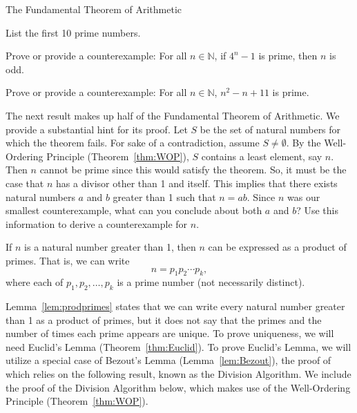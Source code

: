 \begin{section}{The Fundamental Theorem of Arithmetic}
\begin{problem}
List the first 10 prime numbers.
\end{problem}

\begin{problem}
Prove or provide a counterexample:  For all $n\in\mathbb{N}$, if $4^n-1$ is prime, then $n$ is odd.
\end{problem}

\begin{problem}
Prove or provide a counterexample:  For all $n\in\mathbb{N}$, $n^2-n+11$ is prime.
\end{problem}

The next result makes up half of the Fundamental Theorem of Arithmetic. We provide a substantial hint for its proof. Let $S$ be the set of natural numbers for which the theorem fails.  For sake of a contradiction, assume $S\neq \emptyset$.  By the Well-Ordering Principle (Theorem~\ref{thm:WOP}), $S$ contains a least element, say $n$. Then $n$ cannot be prime since this would satisfy the theorem.  So, it must be the case that $n$ has a divisor other than 1 and itself.  This implies that there exists natural numbers $a$ and $b$ greater than 1 such that $n=ab$.  Since $n$ was our smallest counterexample, what can you conclude about both $a$ and $b$?  Use this information to derive a counterexample for $n$.

\begin{lemma}\label{lem:prodprimes}
If $n$ is a natural number greater than 1, then $n$ can be expressed as a product of primes.  That is, we can write
\[
n=p_1 p_2 \cdots p_k,
\]
where each of $p_1, p_2, \ldots, p_k$ is a prime number (not necessarily distinct).
\end{lemma}

Lemma~\ref{lem:prodprimes} states that we can write every natural number greater than 1 as a product of primes, but it does not say that the primes and the number of times each prime appears are unique.  To prove uniqueness, we will need Euclid's Lemma (Theorem~\ref{thm:Euclid}). To prove Euclid's Lemma, we will utilize a special case of Bezout's Lemma (Lemma~\ref{lem:Bezout}), the proof of which relies on the following result, known as the Division Algorithm. We include the proof of the Division Algorithm below, which makes use of the Well-Ordering Principle (Theorem~\ref{thm:WOP}). %


\end{section}
